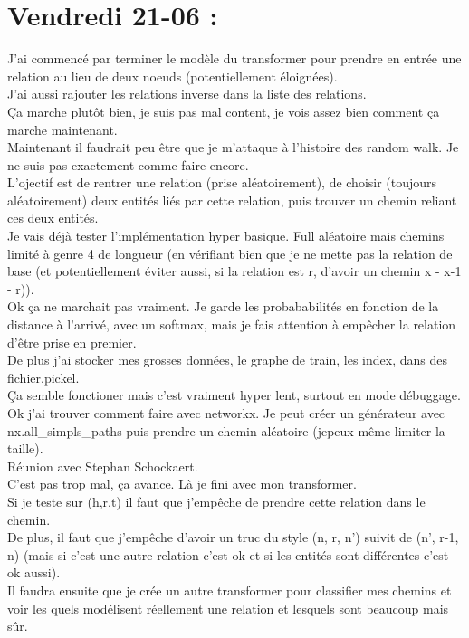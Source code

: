 \documentclass{article}
\begin{document}
\section*{Vendredi 21-06 :}
J'ai commencé par terminer le modèle du transformer pour prendre en entrée une relation au lieu de deux noeuds (potentiellement éloignées).\\
J'ai aussi rajouter les relations inverse dans la liste des relations.\\
Ça marche plutôt bien, je suis pas mal content, je vois assez bien comment ça marche maintenant.\\
Maintenant il faudrait peu être que je m'attaque à l'histoire des random walk. Je ne suis pas exactement comme faire encore.\\
L'ojectif est de rentrer une relation (prise aléatoirement), de choisir (toujours aléatoirement) deux entités liés par cette relation, puis trouver un chemin reliant ces deux entités.\\
Je vais déjà tester l'implémentation hyper basique. Full aléatoire mais chemins limité à genre 4 de longueur (en vérifiant bien que je ne mette pas la relation de base (et potentiellement éviter aussi, si la relation est r, d'avoir un chemin x - x-1 - r)).\\
Ok ça ne marchait pas vraiment. Je garde les probababilités en fonction de la distance à l'arrivé, avec un softmax, mais je fais attention à empêcher la relation d'être prise en premier.\\
De plus j'ai stocker mes grosses données, le graphe de train, les index, dans des fichier.pickel.\\
Ça semble fonctioner mais c'est vraiment hyper lent, surtout en mode débuggage.\\
Ok j'ai trouver comment faire avec networkx. Je peut créer un générateur avec nx.all\_simpls\_paths puis prendre un chemin aléatoire (jepeux même limiter la taille).\\
Réunion avec Stephan Schockaert.\\
C'est pas trop mal, ça avance. Là je fini avec mon transformer.\\
Si je teste sur (h,r,t) il faut que j'empêche de prendre cette relation dans le chemin.\\
De plus, il faut que j'empêche d'avoir un truc du style (n, r, n') suivit de (n', r-1, n) (mais si c'est une autre relation c'est ok et si les entités sont différentes c'est ok aussi).\\
Il faudra ensuite que je crée un autre transformer pour classifier mes chemins et voir les quels modélisent réellement une relation et lesquels sont beaucoup mais sûr.\\
\end{document}
